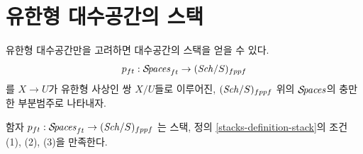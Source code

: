 \section{유한형 대수공간의 스택}
\label{section-stack-of-finite-type-spaces}


\noindent
유한형 대수공간만을 고려하면 대수공간의 스택을 얻을 수 있다.
$$
p_{ft} : \mathcal{S}\!\mathit{paces}_{ft} \to (\mathit{Sch}/S)_{fppf}
$$
를 $X \to U$가 유한형 사상인 쌍 $X/U$들로 이루어진,
$(\mathit{Sch}/S)_{fppf}$ 위의 $\mathcal{S}\!\mathit{paces}$의 충만한 부분범주로 나타내자.

\begin{lemma}
\label{lemma-stack-of-finite-type-spaces}
함자
$p_{ft} : \mathcal{S}\!\mathit{paces}_{ft} \to (\mathit{Sch}/S)_{fppf}$
는 스택, 정의 \ref{stacks-definition-stack}의 조건 (1), (2), (3)을
만족한다.
\end{lemma}

